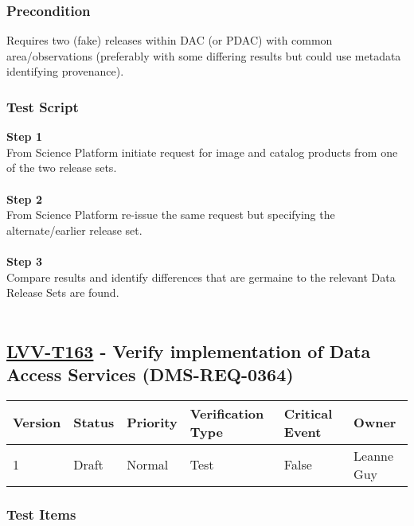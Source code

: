 \hypertarget{precondition-19}{%
\subsubsection{Precondition}\label{precondition-19}}

Requires two (fake) releases within DAC (or PDAC) with common
area/observations (preferably with some differing results but could use
metadata identifying provenance).~

\hypertarget{test-script-139}{%
\subsubsection{Test Script}\label{test-script-139}}

\textbf{Step 1}\\
From Science Platform initiate request for image and catalog products
from one of the two release sets.\\
~\\
\textbf{Step 2}\\
From Science Platform re-issue the same request but specifying the
alternate/earlier release set.\\
~\\
\textbf{Step 3}\\
Compare results and identify differences that are germaine to the
relevant Data Release Sets are found.\\
~\\

\hypertarget{lvv-t163---verify-implementation-of-data-access-services-dms-req-0364}{%
\subsection{\texorpdfstring{\href{https://jira.lsstcorp.org/secure/Tests.jspa\#/testCase/LVV-T163}{LVV-T163}
- Verify implementation of Data Access Services
(DMS-REQ-0364)}{LVV-T163 - Verify implementation of Data Access Services (DMS-REQ-0364)}}\label{lvv-t163---verify-implementation-of-data-access-services-dms-req-0364}}

\begin{longtable}[]{@{}llllll@{}}
\toprule
Version & Status & Priority & Verification Type & Critical Event &
Owner\tabularnewline
\midrule
\endhead
1 & Draft & Normal & Test & False & Leanne Guy\tabularnewline
\bottomrule
\end{longtable}

\hypertarget{test-items-139}{%
\subsubsection{Test Items}\label{test-items-139}}

